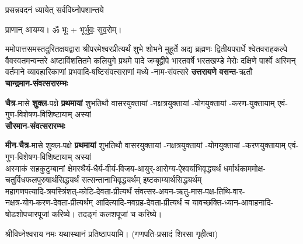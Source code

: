 



{प्रसन्नवदनं ध्यायेत् सर्वविघ्नोपशान्तये}

प्राणान् आयम्य। ॐ भूः + भूर्भुवः॒ सुव॒रोम्।


ममोपात्तसमस्तदुरितक्षयद्वारा श्रीपरमेश्वरप्रीत्यर्थं शुभे शोभने मुहूर्ते अद्य ब्रह्मणः
द्वितीयपरार्धे श्वेतवराहकल्पे वैवस्वतमन्वन्तरे अष्टाविंशतितमे कलियुगे प्रथमे पादे
जम्बूद्वीपे भारतवर्षे भरत\-खण्डे मेरोः दक्षिणे पार्श्वे अस्मिन् वर्तमाने व्यावहारिकाणां
प्रभवादि-षष्टिसंवत्सराणां मध्ये \blank{}-नाम-संवत्सरे \textbf{उत्तरायणे} \textbf{वसन्त}-ऋतौ\\

\textbf{चान्द्रमान-संवत्सरारम्भः}

\textbf{चैत्र}-मासे 	\textbf{शुक्ल}-पक्षे	\textbf{प्रथमायां} शुभतिथौ	\blank\-वासर\-युक्तायां	\blank-नक्षत्र\-युक्तायां	\blank-योग\-युक्तायां	\blank-करण-युक्तायाम्	एवं-गुण-विशेषण-विशिष्टायाम् अस्यां \blank\\

\textbf{सौरमान-संवत्सरारम्भः}

\textbf{मीन}-\textbf{चैत्र}-मासे शुक्ल-पक्षे \textbf{प्रथमायां} शुभतिथौ	\blank\-वासर\-युक्तायां	\blank-नक्षत्र\-युक्तायां	\blank-योग\-युक्तायां	\blank-करण\-युक्तायाम्	एवं-गुण-विशेषण-विशिष्टायाम् अस्यां \blank\\

\noindent अस्माकं सहकुटुम्बानां क्षेमस्थैर्य-धैर्य-वीर्य-विजय-आयुर्-आरोग्य-ऐश्वर्याभि\-वृद्ध्यर्थं
धर्मार्थकाममोक्ष-चतुर्विध\-फल\-पुरुषार्थसिद्ध्यर्थं सत्सन्तानाभि\-वृद्ध्यर्थम् इष्टकाम्यार्थ\-सिद्ध्यर्थम्\\
महागणपत्यादि-त्रयस्त्रिंशत्-कोटि-देवता-प्रीत्यर्थं
संवत्सर-अयन-ऋतु-मास-पक्ष-तिथि-वार-\\
नक्षत्र-योग-करण-देवता-प्रीत्यर्थम्
आदित्यादि-नवग्रह-देवता-प्रीत्यर्थं च यावच्छक्ति-ध्यान-आवाहनादि-षोडशोपचारपूजां करिष्ये। तदङ्गं कलशपूजां च करिष्ये।

श्रीविघ्नेश्वराय नमः यथास्थानं प्रतिष्ठापयामि।
(गणपति-प्रसादं शिरसा गृहीत्वा)







